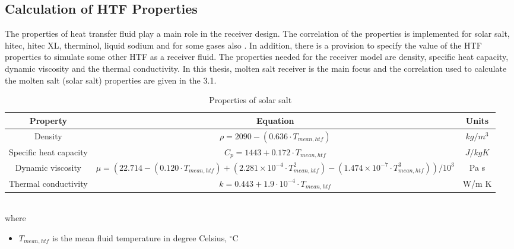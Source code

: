 \subsection{Calculation of HTF Properties}
The properties of heat transfer fluid play a main role in the receiver design. The correlation of the properties is implemented for solar salt, hitec, hitec XL, therminol, liquid sodium and for some gases also \cite{Benoit.2016}. In addition, there is a provision to specify the value of the HTF properties to simulate some other HTF as a receiver fluid. The properties needed for the receiver model are density, specific heat capacity, dynamic viscosity and the thermal conductivity. In this thesis, molten salt receiver is the main focus and the correlation used to calculate the molten salt (solar salt) properties are given in the \tablename{ 3.1}.
\begin{table}[h]
	\centering
	\begin{adjustbox}{width=1\textwidth}
		\large
	\begin{tabular}{|c|c|c| } 
		\hline
		Property & Equation & Units \\
		\hline
		Density & $\rho = 2090 - (0.636 \cdot T_{mean,htf})$ & $kg/m^3$ \\ 
		Specific heat capacity & $C_{p} = 1443 + 0.172 \cdot T_{mean,htf}$ & $J/kg K$  \\
		Dynamic viscosity & $\mu = (22.714 - (0.120 \cdot T_{mean,htf}) + (2.281 \times 10^{-4} \cdot T_{mean,htf}^2) - (1.474 \times 10^{-7} \cdot T_{mean,htf}^3)) / 10^3$ & Pa s\\
		Thermal conductivity & $k = 0.443 + 1.9 \cdot 10^{-4} \cdot T_{mean,htf}$ & W/m K\\ 
		\hline
	\end{tabular}
	\end{adjustbox}
	\caption{Properties of solar salt \cite{Zavoico.2001}}
\end{table}\\
where 
\begin{itemize}
	\item $T_{mean,htf}$ is the mean fluid temperature in degree Celsius, $^{\circ}$C
\end{itemize}
